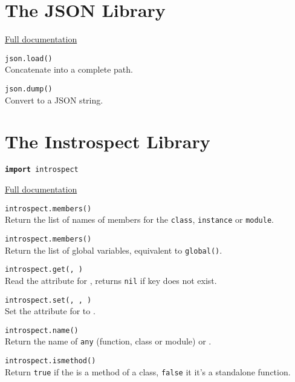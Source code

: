 \section*{The JSON Library}

\hangpar \href{https://github.com/berry-lang/berry/wiki/Chapter-7\#json-module}{Full documentation}

\hangpar \texttt{json.load(}\texttt{)} \\
Concatenate  into a complete path.

\hangpar \texttt{json.dump(}\texttt{)} \\
Convert  to a JSON string.

\section*{The Instrospect Library}

\hangpar \texttt{\textbf{import} introspect}

\hangpar \href{https://github.com/berry-lang/berry/wiki/Chapter-7\#module-introspect}{Full documentation}

\hangpar \texttt{introspect.members(}\texttt{)} \\
Return the list of names of members for the \texttt{class}, \texttt{instance} or \texttt{module}.

\hangpar \texttt{introspect.members()} \\
Return the list of global variables, equivalent to \texttt{global()}.

\hangpar \texttt{introspect.get(}\texttt{, }\texttt{)} \\
Read the attribute  for , returns \texttt{nil} if key does not exist.

\hangpar \texttt{introspect.set(}\texttt{, }\texttt{, }\texttt{)} \\
Set the attribute  for  to .

\hangpar \texttt{introspect.name(}\texttt{)} \\
Return the name of \texttt{any} (function, class or module) or .

\hangpar \texttt{introspect.ismethod(}\texttt{)} \\
Return \texttt{true} if the  is a method of a class, \texttt{false} it it's a standalone function.

